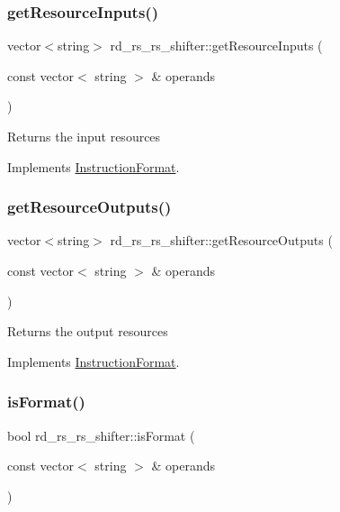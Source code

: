 \subsubsection{\texorpdfstring{get\+Resource\+Inputs()}{getResourceInputs()}}
{\footnotesize\ttfamily vector$<$string$>$ rd\+\_\+rs\+\_\+rs\+\_\+shifter\+::get\+Resource\+Inputs (\begin{DoxyParamCaption}\item[{const vector$<$ string $>$ \&}]{operands }\end{DoxyParamCaption})\hspace{0.3cm}{\ttfamily [virtual]}}

Returns the input resources 

Implements \hyperlink{classInstructionFormat_a09775d3a3c22f40a0f44504664e586e4}{Instruction\+Format}.

\mbox{\label{classrd__rs__rs__shifter_a4ec7aa9c844e62d408c8846406d854ec}} 
\subsubsection{\texorpdfstring{get\+Resource\+Outputs()}{getResourceOutputs()}}
{\footnotesize\ttfamily vector$<$string$>$ rd\+\_\+rs\+\_\+rs\+\_\+shifter\+::get\+Resource\+Outputs (\begin{DoxyParamCaption}\item[{const vector$<$ string $>$ \&}]{operands }\end{DoxyParamCaption})\hspace{0.3cm}{\ttfamily [virtual]}}

Returns the output resources 

Implements \hyperlink{classInstructionFormat_a95cd28ffb1bde59b67f676880ab10536}{Instruction\+Format}.

\mbox{\label{classrd__rs__rs__shifter_aa60a168e3fb236635bab054c85a8ef0e}} 
\subsubsection{\texorpdfstring{is\+Format()}{isFormat()}}
{\footnotesize\ttfamily bool rd\+\_\+rs\+\_\+rs\+\_\+shifter\+::is\+Format (\begin{DoxyParamCaption}\item[{const vector$<$ string $>$ \&}]{operands }\end{DoxyParamCaption})\hspace{0.3cm}{\ttfamily [virtual]}}

